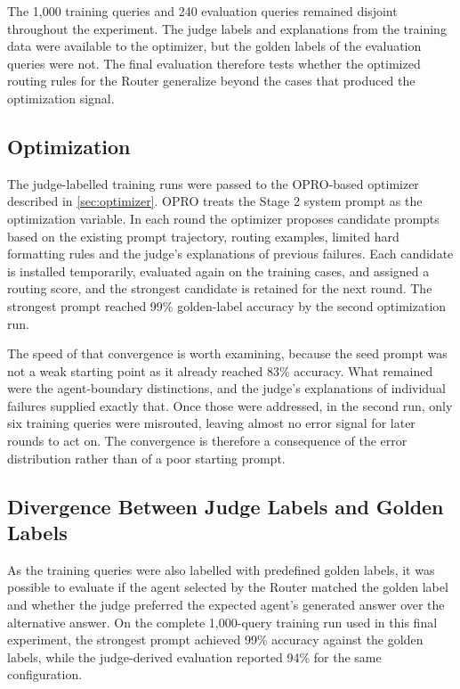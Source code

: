 The 1,000 training queries and 240 evaluation queries remained disjoint throughout the experiment. The judge labels and explanations from the training data were available to the optimizer, but the golden labels of the evaluation queries were not. The final evaluation therefore tests whether the optimized routing rules for the Router generalize beyond the cases that produced the optimization signal.

\subsection{Optimization}\label{sec:empirical-optimization}

The judge-labelled training runs were passed to the OPRO-based optimizer described in \cref{sec:optimizer}. OPRO treats the Stage 2 system prompt as the optimization variable. In each round the optimizer proposes candidate prompts based on the existing prompt trajectory, routing examples, limited hard formatting rules and the judge's explanations of previous failures. Each candidate is installed temporarily, evaluated again on the training cases, and assigned a routing score, and the strongest candidate is retained for the next round. The strongest prompt reached 99\% golden-label accuracy by the second optimization run.

The speed of that convergence is worth examining, because the seed prompt was not a weak starting point as it already reached 83\% accuracy. What remained were the agent-boundary distinctions, and the judge's explanations of individual failures supplied exactly that. Once those were addressed, in the second run, only six training queries were misrouted, leaving almost no error signal for later rounds to act on. The convergence is therefore a consequence of the error distribution rather than of a poor starting prompt.

\subsection{Divergence Between Judge Labels and Golden Labels}\label{sec:empirical-label-divergence}

As the training queries were also labelled with predefined golden labels, it was possible to evaluate if the agent selected by the Router matched the golden label and whether the judge preferred the expected agent's generated answer over the alternative answer. On the complete 1,000-query training run used in this final experiment, the strongest prompt achieved 99\% accuracy against the golden labels, while the judge-derived evaluation reported 94\% for the same configuration.

